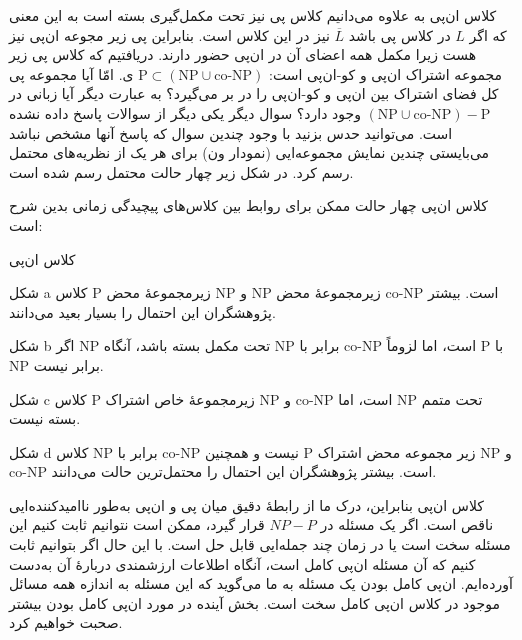 \begin{itemframe}{کلاس ان‌پی}
\itm
به علاوه می‌دانیم کلاس پی نیز تحت مکمل‌گیری بسته است به این معنی که اگر $ L $ در کلاس پی باشد $ \overbar{L} $ نیز در این کلاس است. بنابراین پی زیر مجوعه ان‌پی نیز هست زیرا مکمل همه اعضای آن در ان‌پی حضور دارند.
\itm
دریافتیم که کلاس پی زیر مجموعه اشتراک ان‌پی و کو-ان‌پی است:
$ \text{P} \subset (\text{NP} \cup \text{co-NP})$
ی. امّا آیا مجموعه پی کل فضای اشتراک بین ان‌پی و کو-ان‌پی را در بر می‌گیرد؟ به عبارت دیگر آیا زبانی در
$(\text{NP} \cup \text{co-NP}) - \text{P} $
 وجود دارد؟
\itm
سوال دیگر یکی دیگر از سوالات پاسخ داده نشده است. می‌توانید حدس بزنید با وجود چندین سوال که پاسخ آنها مشخص نباشد می‌بایستی چندین نمایش مجموعه‌ایی (نمودار ون) برای هر یک از نظریه‌های محتمل رسم کرد. در شکل زیر چهار حالت محتمل رسم شده است.
\end{itemframe}


\begin{itemframe}{کلاس ان‌پی}
\itm
چهار حالت ممکن برای روابط بین کلاس‌های پیچیدگی زمانی بدین شرح است:
\end{itemframe}


\begin{itemframe}{کلاس ان‌پی}
\item[شکل a]
کلاس P زیرمجموعهٔ محض NP و NP زیرمجموعهٔ محض co-NP است. بیشتر پژوهشگران این احتمال را بسیار بعید می‌دانند.
\item[شکل b]
اگر NP تحت مکمل بسته باشد، آنگاه NP برابر با co-NP است، اما لزوماً P با NP برابر نیست.
\item[شکل c]
کلاس P زیرمجموعهٔ خاص اشتراک NP و co-NP است، اما NP تحت متمم بسته نیست.
\item[شکل d]
کلاس NP برابر با co-NP نیست و همچنین P زیر مجموعه محض اشتراک NP و co-NP است. بیشتر پژوهشگران این احتمال را محتمل‌ترین حالت می‌دانند.
\end{itemframe}


\begin{itemframe}{کلاس ان‌پی}
\itm
بنابراین، درک ما از رابطهٔ دقیق میان پی و ان‌پی به‌طور ناامیدکننده‌ایی ناقص است. اگر یک مسئله در $ NP - P $ قرار گیرد، ممکن است نتوانیم ثابت کنیم این مسئله سخت است یا در زمان چند جمله‌ایی قابل حل است.
\itm
با این حال اگر بتوانیم ثابت کنیم که آن مسئله ان‌پی کامل است، آنگاه اطلاعات ارزشمندی دربارهٔ آن به‌دست آورده‌ایم. ان‌پی کامل بودن یک مسئله به ما می‌گوید که این مسئله به اندازه همه مسائل موجود در کلاس ان‌پی کامل سخت است.
\itm
بخش آینده در مورد  ان‌پی کامل بودن بیشتر صحبت خواهیم کرد.
\end{itemframe}
